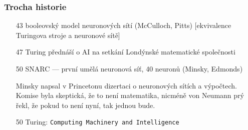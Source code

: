 \documentclass[red,handout,professionalfont]{beamer}
\theoremstyle{definition}
\newcommand{\0}{\mbox{${\bf 0}$}}
\begin{document}
\begin{frame}\frametitle{Trocha historie}
\begin{itemize}
 \item[43] booleovský model neuronových sítí (McCulloch, Pitts) [ekvivalence Turingova stroje a neuronové sítě]\pause{}
 \item[47] Turing přednáší o AI na setkání Londýnské matematické společnosti\pause{}
 \item[50] SNARC --- první umělá neuronová síť, 40 neuronů (Minsky, Edmonds)\pause{}
  \begin{block}{}
  \small
 Minsky napsal v Princetonu dizertaci o neuronových sítích a výpočtech. Komise byla skeptická, že to není matematika,
 nicméně von Neumann prý řekl, že pokud to není nyní, tak jednou bude.
 \end{block}\pause{}
 \item[50] Turing: {\tt Computing Machinery and Intelligence}
 \end{itemize}
\end{frame}
\end{document}
